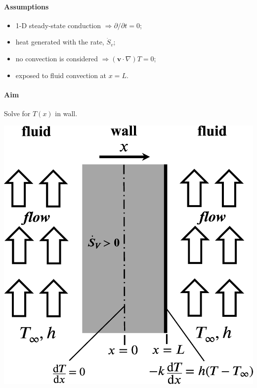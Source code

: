 \documentclass[12pt, a4paper]{article}
\begin{document}
\begin{tcolorbox}[breakable, title = \textbf{Example: Internal Heat Generation}]
\begin{minipage}{.6\textwidth}
    \paragraph{Assumptions} 
    \begin{itemize}
        \item 1-D steady-state conduction  $\Rightarrow \partial / \partial t = 0$;
        \item heat generated with the rate, $\dot{S}_{v}$;
        \item no convection is considered $\Rightarrow (\bm{v} \cdot \nabla) T = 0$;
        \item exposed to fluid convection at $x=L$.
    \end{itemize}
    \paragraph{Aim} Solve for $T(x)$ in wall.
\end{minipage}
\begin{minipage}{.4\textwidth}
    \includegraphics[width=\textwidth]{img/internal_heat_gen.eps}
\end{minipage}


\end{tcolorbox}
\end{document}
